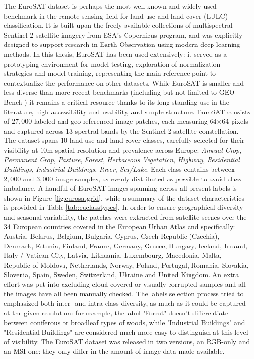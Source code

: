 \documentclass[a4paper, oneside, english]{sapthesis} %
\begin{document}
The EuroSAT dataset \cite{helber2019eurosat} is perhaps the most well known and widely used benchmark in the remote sensing field for land use and land cover (LULC) classification. It is built upon the freely available collections of multispectral Sentinel-2 satellite imagery from ESA’s Copernicus program, and was explicitly designed to support research in Earth Observation using modern deep learning methods. In this thesis, EuroSAT has been used extensively: it served as a prototyping environment for model testing, exploration of normalization strategies and model training, representing the main reference point to contextualize the performance on other datasets. While EuroSAT is smaller and less diverse than more recent benchmarks (including but not limited to GEO-Bench \cite{lacoste2023geo}) it remains a critical resource thanks to its long-standing use in the literature, high accessibility and usability, and simple structure. EuroSAT consists of $27,000$ labeled and geo-referenced image patches, each measuring 64×64 pixels and captured across $13$ spectral bands by the Sentinel-2 satellite constellation. The dataset spans $10$ land use and land cover classes, carefully selected for their visibility at $10$m spatial resolution and prevalence across Europe: \emph{Annual Crop}, \emph{Permanent Crop}, \emph{Pasture}, \emph{Forest}, \emph{Herbaceous Vegetation}, \emph{Highway}, \emph{Residential Buildings}, \emph{Industrial Buildings}, \emph{River}, \emph{Sea/Lake}. Each class contains between $2,000$ and $3,000$ image samples, as evenly distributed as possible to avoid class imbalance. A handful of EuroSAT images spanning across all present labels is shown in Figure \ref{fig:eurosatgrid}, while a summary of the dataset characteristics is provided in Table \ref{tab:euclasstypes}. In order to ensure geographical diversity and seasonal variability, the patches were extracted from satellite scenes over the 34 European countries covered in the European Urban Atlas and specifically: Austria, Belarus, Belgium, Bulgaria, Cyprus, Czech Republic (Czechia), Denmark, Estonia, Finland, France, Germany, Greece, Hungary, Iceland, Ireland, Italy / Vatican City, Latvia, Lithuania, Luxembourg, Macedonia, Malta, Republic of Moldova, Netherlands, Norway, Poland, Portugal, Romania, Slovakia, Slovenia, Spain, Sweden, Switzerland, Ukraine and United Kingdom. An extra effort was put into excluding cloud-covered or visually corrupted samples and all the images have all been manually checked. The labels selection process tried to emphasized both inter- and intra-class diversity, as much as it could be captured at the given resolution: for example, the label "Forest" doesn't differentiate between coniferous or broadleaf types of woods, while "Industrial Buildings" and "Residential Buildings" are considered much more easy to distinguish at this level of visibility. The EuroSAT dataset was released in two versions, an RGB-only and an MSI one: they only differ in the amount of image data made available.
\end{document}
